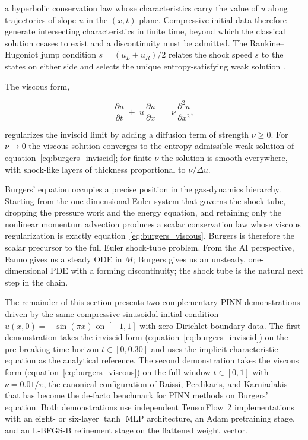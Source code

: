 \documentclass[11pt,a4paper]{report}
\begin{document}
a hyperbolic conservation law whose characteristics carry the value of $u$ along trajectories of slope $u$ in the $(x,t)$ plane. Compressive initial data therefore generate intersecting characteristics in finite time, beyond which the classical solution ceases to exist and a discontinuity must be admitted. The Rankine--Hugoniot jump condition $s = (u_L + u_R)/2$ relates the shock speed $s$ to the states on either side and selects the unique entropy-satisfying weak solution \cite{LeVeque2002}.

The viscous form,

\begin{equation}
\label{eq:burgers_viscous}
\frac{\partial u}{\partial t} \;+\; u\,\frac{\partial u}{\partial x} \;=\; \nu\,\frac{\partial^{2} u}{\partial x^{2}},
\end{equation}

regularizes the inviscid limit by adding a diffusion term of strength $\nu \ge 0$. For $\nu \to 0$ the viscous solution converges to the entropy-admissible weak solution of equation~\eqref{eq:burgers_inviscid}; for finite $\nu$ the solution is smooth everywhere, with shock-like layers of thickness proportional to $\nu/\Delta u$.

Burgers' equation occupies a precise position in the gas-dynamics hierarchy. Starting from the one-dimensional Euler system that governs the shock tube, dropping the pressure work and the energy equation, and retaining only the nonlinear momentum advection produces a scalar conservation law whose viscous regularization is exactly equation~\eqref{eq:burgers_viscous}. Burgers is therefore the scalar precursor to the full Euler shock-tube problem. From the AI perspective, Fanno gives us a steady ODE in $M$; Burgers gives us an unsteady, one-dimensional PDE with a forming discontinuity; the shock tube is the natural next step in the chain.

The remainder of this section presents two complementary PINN demonstrations driven by the same compressive sinusoidal initial condition $u(x, 0) = -\sin(\pi x)$ on $[-1, 1]$ with zero Dirichlet boundary data. The first demonstration takes the inviscid form (equation~\eqref{eq:burgers_inviscid}) on the pre-breaking time horizon $t \in [0, 0.30]$ and uses the implicit characteristic equation as the analytical reference. The second demonstration takes the viscous form (equation~\eqref{eq:burgers_viscous}) on the full window $t \in [0, 1]$ with $\nu = 0.01/\pi$, the canonical configuration of Raissi, Perdikaris, and Karniadakis~\cite{Raissi2019PINN} that has become the de-facto benchmark for PINN methods on Burgers' equation. Both demonstrations use independent TensorFlow~2 implementations with an eight- or six-layer $\tanh$ MLP architecture, an Adam pretraining stage, and an L-BFGS-B refinement stage on the flattened weight vector.
\end{document}
